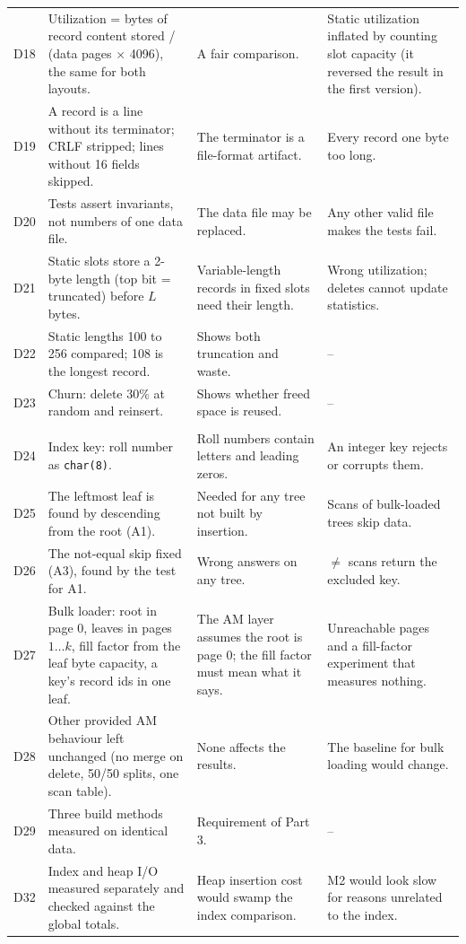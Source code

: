 \documentclass[11pt,a4paper]{article}
\begin{document}
\begin{longtable}{>{\raggedright\arraybackslash}p{0.7cm}>{\raggedright\arraybackslash}p{5.2cm}>{\raggedright\arraybackslash}p{4.4cm}>{\raggedright\arraybackslash}p{4.3cm}}
D18 & Utilization = bytes of record content stored / (data pages \(\times\) 4096), the same for both layouts. & A fair comparison. & Static utilization inflated by counting slot capacity (it reversed the result in the first version). \\
D19 & A record is a line without its terminator; CRLF stripped; lines without 16 fields skipped. & The terminator is a file-format artifact. & Every record one byte too long. \\
D20 & Tests assert invariants, not numbers of one data file. & The data file may be replaced. & Any other valid file makes the tests fail. \\
D21 & Static slots store a 2-byte length (top bit = truncated) before \(L\) bytes. & Variable-length records in fixed slots need their length. & Wrong utilization; deletes cannot update statistics. \\
D22 & Static lengths 100 to 256 compared; 108 is the longest record. & Shows both truncation and waste. & -- \\
D23 & Churn: delete 30\% at random and reinsert. & Shows whether freed space is reused. & -- \\
\multicolumn{4}{l}{\textit{Part 3: B+ tree index}} \\
D24 & Index key: roll number as \texttt{char(8)}. & Roll numbers contain letters and leading zeros. & An integer key rejects or corrupts them. \\
D25 & The leftmost leaf is found by descending from the root (A1). & Needed for any tree not built by insertion. & Scans of bulk-loaded trees skip data. \\
D26 & The not-equal skip fixed (A3), found by the test for A1. & Wrong answers on any tree. & \(\ne\) scans return the excluded key. \\
D27 & Bulk loader: root in page 0, leaves in pages \(1 \ldots k\), fill factor from the leaf byte capacity, a key's record ids in one leaf. & The AM layer assumes the root is page 0; the fill factor must mean what it says. & Unreachable pages and a fill-factor experiment that measures nothing. \\
D28 & Other provided AM behaviour left unchanged (no merge on delete, 50/50 splits, one scan table). & None affects the results. & The baseline for bulk loading would change. \\
D29 & Three build methods measured on identical data. & Requirement of Part 3. & -- \\
D32 & Index and heap I/O measured separately and checked against the global totals. & Heap insertion cost would swamp the index comparison. & M2 would look slow for reasons unrelated to the index. \\

\end{longtable}
\end{document}
